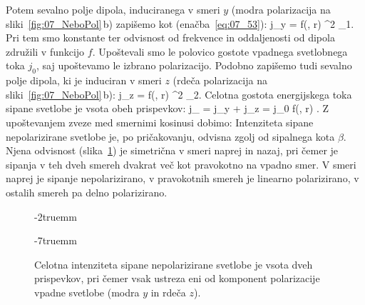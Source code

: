 Potem sevalno polje dipola, induciranega v smeri $y$ (modra polarizacija 
na sliki~\ref{fig:07_NeboPol}\,b) zapišemo kot (enačba~\ref{eq:07_53}):
\beq
j_y =  f(\omega, r) \sin^2 \vartheta_1.
\label{eq:07_58}
\eeq
Pri tem smo konstante ter odvisnost od frekvence in oddaljenosti od dipola združili 
v funkcijo $f$. Upoštevali smo le polovico gostote vpadnega svetlobnega toka $j_0$, saj 
upoštevamo le izbrano polarizacijo. Podobno zapišemo tudi sevalno polje dipola, ki je 
induciran v smeri $z$ (rdeča polarizacija na sliki~\ref{fig:07_NeboPol}\,b):
\beq
j_z =  f(\omega, r) \sin^2 \vartheta_2.
\label{eq:07_59}
\eeq
Celotna gostota energijskega toka sipane svetlobe je vsota obeh prispevkov:
\beq
j_ = j_y + j_z = j_0 f(\omega, r) .
\label{eq:07_60}
\eeq
Z upoštevanjem zveze med smernimi kosinusi dobimo:
Intenziteta sipane nepolarizirane svetlobe je, po pričakovanju, odvisna zgolj od sipalnega kota $\beta$.
Njena odvisnost (slika~\ref{fig:07_nepol}) je simetrična v smeri naprej in nazaj, pri čemer je 
sipanja v teh dveh smereh dvakrat več kot pravokotno na vpadno smer. V smeri naprej je sipanje 
nepolarizirano, v pravokotnih smereh je linearno polarizirano, v ostalih smereh pa delno polarizirano.
\begin{figure}[!h]
\vglue-2truemm
\centering
\def\svgwidth{70truemm} 

\caption{Celotna intenziteta sipane nepolarizirane svetlobe je vsota dveh prispevkov, pri čemer vsak
ustreza eni od komponent polarizacije vpadne svetlobe (modra $y$ in rdeča $z$).}
\label{fig:07_nepol}
\vglue-7truemm
\end{figure}

